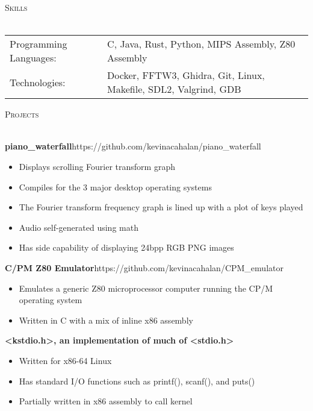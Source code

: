 \documentclass[a4paper]{article}
\newcommand{\lineunder} {
	\vspace*{-8pt} \\
	\hspace*{-18pt} \hrulefill \\
}
\newcommand{\header} [1] {
	{\hspace*{-18pt}\vspace*{6pt} \textsc{#1}}
	\vspace*{-6pt} \lineunder
}
\begin{document}
	\header{Skills}
	\begin{tabular}{ l l }
		Programming Languages: & C, Java, Rust, Python, MIPS Assembly, Z80 Assembly \\
		Technologies:          & Docker, FFTW3, Ghidra, Git, Linux, Makefile, SDL2, Valgrind, GDB \\
	\end{tabular}
	\vspace{2mm}




	\header{Projects}
	\vspace{1mm}
	
	\textbf{piano\_waterfall}\hfill https://github.com/kevinacahalan/piano\_waterfall\\
	\vspace{-2mm}
	\begin{itemize} \itemsep -3pt
		\item Displays scrolling Fourier transform graph
		\item Compiles for the 3 major desktop operating systems
		\item The Fourier transform frequency graph is lined up with a plot of keys played
		\item Audio self-generated using math
		\item Has side capability of displaying 24bpp RGB PNG images
	\end{itemize}
	
	\textbf{C/PM Z80 Emulator}\hfill https://github.com/kevinacahalan/CPM\_emulator\\
	\vspace{-2mm}
	\begin{itemize} \itemsep -3pt
		\item Emulates a generic Z80 microprocessor computer running the CP/M operating system 
		\item Written in C with a mix of inline x86 assembly
	\end{itemize}
	
	\textbf{\textless{}kstdio.h\textgreater{}, an implementation of much of \textless{}stdio.h\textgreater{}}
	\vspace{-2mm}
	\begin{itemize} \itemsep -3pt
		\item Written for x86-64 Linux
		\item Has standard I/O functions such as printf(), scanf(), and puts()
		\item Partially written in x86 assembly to call kernel
	\end{itemize}
	
\end{document}
